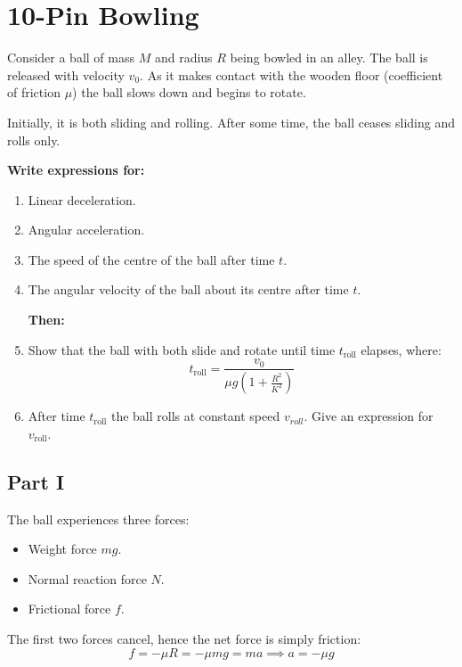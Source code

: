 
\section{10-Pin Bowling}

Consider a ball of mass $M$ and radius $R$ being bowled in an alley. The ball is released with velocity $v_0$. As it makes contact with the wooden floor (coefficient of friction $\mu$) the ball slows down and begins to rotate.

Initially, it is both sliding and rolling. After some time, the ball ceases sliding and rolls only. 

\textbf{Write expressions for:}

\begin{enumerate}
    \item Linear deceleration.
    \item Angular acceleration.
    \item The speed of the centre of the ball after time $t$.
    \item The angular velocity of the ball about its centre after time $t$.
    
    {\hspace*{-\leftmargin}}\textbf{Then:} 

    \item Show that the ball with both slide and rotate until time $t_\text{roll}$ elapses, where:
    \[
        t_\text{roll} = \frac{v_0}{\mu g \left(1 + \frac{R^2}{K^2}\right)}
    \]
    \item After time $t_\text{roll}$ the ball rolls at constant speed $v_{roll}$.  Give an expression for $v_\text{roll}$.
\end{enumerate}

\subsection{Part I}
The ball experiences three forces:
\begin{itemize}
    \item Weight force $mg$.
    \item Normal reaction force $N$.
    \item Frictional force $f$.
\end{itemize}

The first two forces cancel, hence the net force is simply friction:
\[
    f = - \mu R = - \mu mg = ma \implies a = - \mu g
\]

